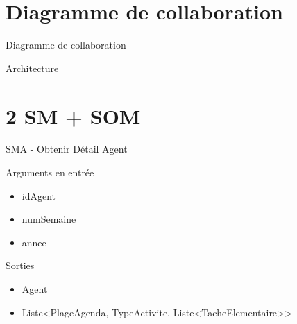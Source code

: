 \documentclass[xetex]{beamer}
\begin{document}
    
    \section{Diagramme de collaboration} %
    \begin{frame}{Diagramme de collaboration}
\noindent{}
    \end{frame}
    
    \begin{frame}{Architecture}
\noindent{}
    \end{frame}
    
\section{2 SM + SOM} %

\begin{frame}{SMA - Obtenir Détail Agent}
\begin{small}
\noindent Arguments en entrée
\begin{itemize}
\item idAgent 
\item numSemaine 
\item annee  \\
\end{itemize}

\noindent Sorties
\begin{itemize}
\item Agent
\item Liste<PlageAgenda, TypeActivite, Liste<TacheElementaire>>
\end{itemize}
\end{small}

\end{frame}
\end{document}
